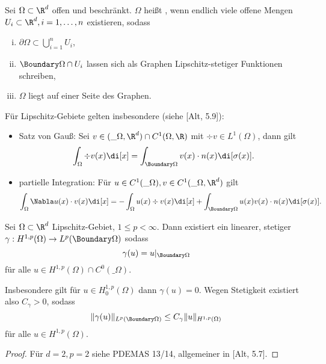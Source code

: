 
\begin{df}
	Sei $\Omega \subset \R^d$ offen und beschränkt.
	$\Omega$ heißt , wenn endlich viele offene Mengen $U_i \subset \R^d, i = 1, \dotsc, n$ existieren, sodass
	\begin{enumerate}[i)]
		\item
			$\partial \Omega \subset \bigcup_{i=1}^n U_i$,
		\item
			$\Boundary \Omega \cap U_i$ lassen sich als Graphen Lipschitz-stetiger Funktionen schreiben,
		\item
			$\Omega$ liegt auf einer Seite des Graphen.
	\end{enumerate}
	\begin{note}
		Für Lipschitz-Gebiete gelten insbesondere (siehe [Alt, 5.9]):
		\begin{itemize}
			\item
				Satz von Gauß:
				Sei $v \in (\_\Omega, \R^d) \cap C^1(\Omega, \R)$ mit $\div v \in L^1(\Omega)$, dann gilt
				\[
					\int_\Omega \div v(x) \di[x]
					= \int_{\Boundary \Omega} v(x) \cdot n(x) \di[\sigma(x)].
				\]
			\item
				partielle Integration:
				Für $u \in C^1(\_\Omega), v \in C^1(\_\Omega, \R^d)$ gilt
				\[
					\int_\Omega \Nabla u(x) \cdot v(x) \di[x]
					= - \int_\Omega u(x) \div v(x) \di[x] + \int_{\Boundary \Omega} u(x) v(x) \cdot n(x) \di[\sigma(x)].
				\]
		\end{itemize}
	\end{note}
\end{df}

\begin{st}[Spursatz] \label{3.10}
	Sei $\Omega \subset \R^d$ Lipschitz-Gebiet, $1 \le p < \infty$.
	Dann existiert ein linearer, stetiger  $\gamma: H^{1,p}(\Omega) \to L^p(\Boundary \Omega)$ sodass
	\[
		\gamma(u) = u|_{\Boundary \Omega}
	\]
	für alle $u \in H^{1,p}(\Omega) \cap C^0(\_\Omega)$.

	Insbesondere gilt für $u \in H_0^{1,p}(\Omega)$ dann $\gamma(u) = 0$.
	Wegen Stetigkeit existiert also $C_\gamma > 0$, sodass
	\[
		\|\gamma(u)\|_{L^p(\Boundary \Omega)} \le C_\gamma \|u\|_{H^{1,p}(\Omega)}
	\]
	für alle $u \in H^{1,p}(\Omega)$.
	\begin{proof}
		Für $d = 2, p = 2$ siehe PDEMAS 13/14, allgemeiner in [Alt, 5.7].
	\end{proof}
\end{st}

